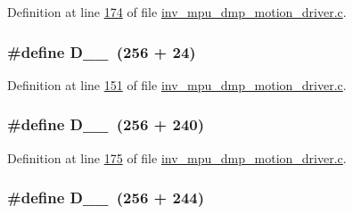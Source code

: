 Definition at line \hyperlink{inv__mpu__dmp__motion__driver_8c_source_l00174}{174} of file \hyperlink{inv__mpu__dmp__motion__driver_8c_source}{inv\+\_\+mpu\+\_\+dmp\+\_\+motion\+\_\+driver.\+c}.

\subsubsection[{\texorpdfstring{D\+\_\+1\+\_\+24}{D_1_24}}]{\setlength{\rightskip}{0pt plus 5cm}\#define D\+\_\+\_~(256 + 24)}\hypertarget{group___d_r_i_v_e_r_s_gac84316958d525db0c89e1519e8af6637}{}\label{group___d_r_i_v_e_r_s_gac84316958d525db0c89e1519e8af6637}


Definition at line \hyperlink{inv__mpu__dmp__motion__driver_8c_source_l00151}{151} of file \hyperlink{inv__mpu__dmp__motion__driver_8c_source}{inv\+\_\+mpu\+\_\+dmp\+\_\+motion\+\_\+driver.\+c}.

\subsubsection[{\texorpdfstring{D\+\_\+1\+\_\+240}{D_1_240}}]{\setlength{\rightskip}{0pt plus 5cm}\#define D\+\_\+\_~(256 + 240)}\hypertarget{group___d_r_i_v_e_r_s_ga9156998202039a8904e4733bd37faf4e}{}\label{group___d_r_i_v_e_r_s_ga9156998202039a8904e4733bd37faf4e}


Definition at line \hyperlink{inv__mpu__dmp__motion__driver_8c_source_l00175}{175} of file \hyperlink{inv__mpu__dmp__motion__driver_8c_source}{inv\+\_\+mpu\+\_\+dmp\+\_\+motion\+\_\+driver.\+c}.

\subsubsection[{\texorpdfstring{D\+\_\+1\+\_\+244}{D_1_244}}]{\setlength{\rightskip}{0pt plus 5cm}\#define D\+\_\+\_~(256 + 244)}\hypertarget{group___d_r_i_v_e_r_s_gaa65adef1ba1e6fd197e3058089c559fb}{}\label{group___d_r_i_v_e_r_s_gaa65adef1ba1e6fd197e3058089c559fb}


